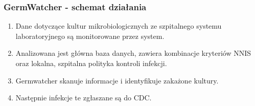\begin{frame}
\frametitle{GermWatcher - schemat działania}

  \begin{enumerate}
	  \item Dane dotyczące kultur mikrobiologicznych ze szpitalnego systemu laboratoryjnego są monitorowane przez system.
	  \item Analizowana jest główna baza danych, zawiera kombinacje kryteriów NNIS oraz lokalna, szpitalna polityka kontroli infekcji.
	  \item Germwatcher skanuje informacje i identyfikuje zakażone kultury.
	  \item Następnie infekcje te zgłaszane są do CDC. 
  \end{enumerate}

\end{frame}

